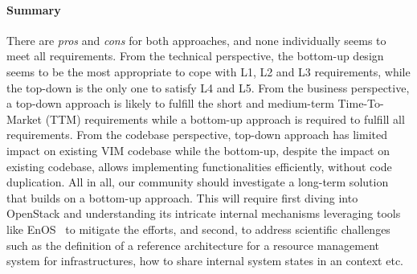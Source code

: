 \paragraph{Summary}
There are \emph{pros} and \emph{cons} for both approaches,
and none individually seems to meet all requirements.
From the technical perspective, the bottom-up
design seems to be the most appropriate to cope with L1, L2 and L3
requirements, while the top-down is the only one to satisfy L4
and L5.
%
From the business perspective, a top-down approach is likely to fulfill the
short and medium-term Time-To-Market (TTM) requirements while a bottom-up
approach is required to fulfill all requirements. 
%
From the codebase perspective, top-down approach has limited impact on 
existing VIM codebase while the bottom-up, despite the impact 
on existing codebase, allows implementing functionalities efficiently, without code
duplication. 
%
All in all, our community should investigate a long-term solution that
builds on a bottom-up approach.  This will require first diving into
OpenStack and understanding its intricate internal mechanisms leveraging
tools like EnOS~\cite{cherrueau2017toward} to mitigate the efforts,
and second, to address scientific challenges such as the definition of
a reference architecture for a resource management system for \edge
infrastructures, how to share internal system states in an \edge
context etc. 












